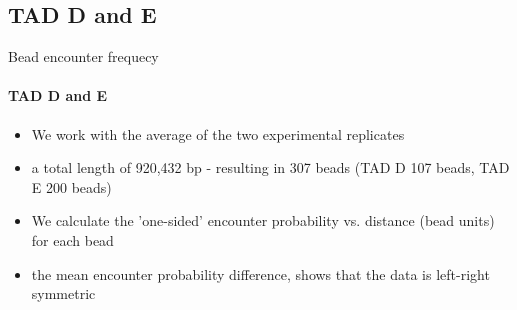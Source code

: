 \documentclass[8pt]{beamer}
\begin{document}
\subsection{TAD D and E}\label{subsection_tadDAndE}
\begin{frame}{Bead encounter frequecy}
\framesubtitle{TAD D and E}
\begin{itemize}
\item We work with the average of the two experimental replicates
\item a total length of 920,432 bp - resulting in 307 beads (TAD D 107 beads, TAD E 200 beads)
\item We calculate the 'one-sided' encounter probability vs. distance (bead units) for each bead
\item the mean encounter probability difference, shows that the data is left-right symmetric


\end{itemize}
\end{frame}
\end{document}

